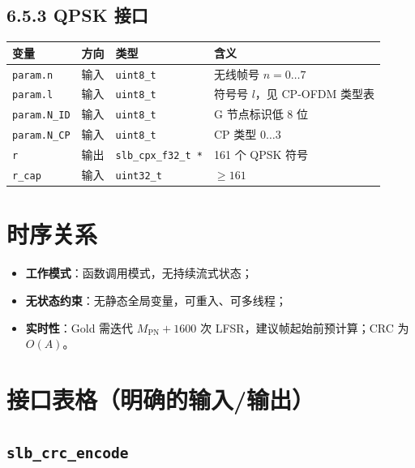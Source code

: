 \documentclass[11pt,a4paper]{ctexart}
\begin{document}
\subsection{6.5.3 QPSK 接口}

\begin{table}[h]
\centering
\small
\begin{tabular}{llll}
\toprule
\textbf{变量} & \textbf{方向} & \textbf{类型} & \textbf{含义} \\
\midrule
\texttt{param.n} & 输入 & \texttt{uint8\_t} & 无线帧号 $n{=}0\ldots 7$ \\
\texttt{param.l} & 输入 & \texttt{uint8\_t} & 符号号 $l$，见 CP-OFDM 类型表 \\
\texttt{param.N\_ID} & 输入 & \texttt{uint8\_t} & G 节点标识低 8 位 \\
\texttt{param.N\_CP} & 输入 & \texttt{uint8\_t} & CP 类型 $0\ldots 3$ \\
\texttt{r} & 输出 & \texttt{slb\_cpx\_f32\_t *} & 161 个 QPSK 符号 \\
\texttt{r\_cap} & 输入 & \texttt{uint32\_t} & $\geq 161$ \\
\bottomrule
\end{tabular}
\end{table}

\section{时序关系}

\begin{itemize}[nosep]
  \item \textbf{工作模式}：函数调用模式，无持续流式状态；
  \item \textbf{无状态约束}：无静态全局变量，可重入、可多线程；
  \item \textbf{实时性}：Gold 需迭代 $M_{\mathrm{PN}}{+}1600$ 次 LFSR，建议帧起始前预计算；CRC 为 $O(A)$。
\end{itemize}

\section{接口表格（明确的输入/输出）}

\subsection{\texttt{slb\_crc\_encode}}
\end{document}
